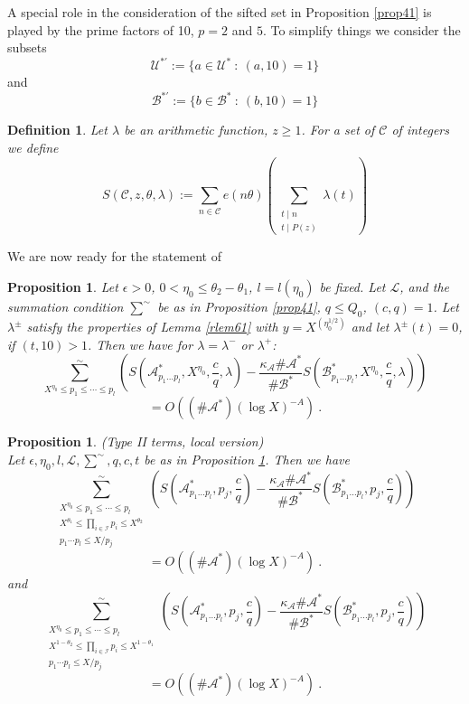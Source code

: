 \documentclass{amsart}
\newtheorem{proposition}[theorem]{Proposition}
\numberwithin{equation}{subsection}
\newtheorem{definition}[theorem]{Definition}
\begin{document}
A special role in the consideration of the sifted set in Proposition \ref{prop41} is played by the prime factors of 10, $p=2$ and $5$. To simplify things we consider the subsets
$$\mathcal{U}^{*'}:=\{a\in \mathcal{U}^*\::\: (a, 10)=1\}$$
and
$$\mathcal{B}^{*'}:=\{ b\in \mathcal{B}^*\::\: (b, 10)=1\}$$


\begin{definition}\label{def62}
Let $\lambda$ be an arithmetic function, $z\geq 1$. For a set of $\mathcal{C}$ of integers we define 
$$S(\mathcal{C}, z, \theta, \lambda):=\sum_{n\in \mathcal{C}} e(n\theta)\left(\sum_{\substack{t\mid n \\ t\mid P(z)}} \lambda(t)\right)$$
\end{definition}
We are now ready for the statement of 

\begin{proposition}\label{prop63}
Let $\epsilon>0$, $0<\eta_0\leq \theta_2-\theta_1$, $l=l(\eta_0)$ be fixed. Let $\mathcal{L}$, and the summation condition $\sum^\sim$ be as in Proposition \ref{prop41}, $q\leq Q_0$, $(c, q)=1$. Let $\lambda^\pm$ satisfy the properties of Lemma \ref{rlem61} with $y=X^{(\eta_0^{1/2})}$ and let $\lambda^\pm(t)=0$, if $(t, 10)>1$. Then we have for $\lambda=\lambda^-$ or $\lambda^+$:
$$\sum_{X^{\eta_0}\leq p_1\leq \cdots \leq p_l}^\sim \left( S\left(\mathcal{A}^*_{p_1 \ldots p_l}, X^{\eta_0}, \frac{c}{q}, \lambda\right)-
\frac{\kappa_{\mathcal{A}}\#\mathcal{A}^*}{\#\mathcal{B}^*}  S\left(\mathcal{B}^*_{p_1 \ldots p_l}, X^{\eta_0}, \frac{c}{q}, \lambda\right)  \right)$$
$$=O\left((\#\mathcal{A}^*)(\log X)^{-A}\right)\:.$$
\end{proposition}

\begin{proposition}\label{prop64}(Type II terms, local version)\\
Let $\epsilon, \eta_0, l, \mathcal{L}, \sum^\sim, q, c, t$ be as in Proposition \ref{prop63}. Then we have
$$\sum^\sim_{\substack{X^{\eta_0}\leq p_1\leq \cdots \leq p_l \\ X^{\theta_1}\leq \prod_{i\in \mathcal{I}} p_i\leq X^{\theta_2}\\ p_1\cdots p_l\leq X/p_j}} \left( S\left(\mathcal{A}^*_{p_1 \ldots p_l}, p_j, \frac{c}{q}\right)-\frac{\kappa_{\mathcal{A}}\#\mathcal{A}^*}{\#\mathcal{B}^*}  S\left(\mathcal{B}^*_{p_1 \ldots p_l}, p_j, \frac{c}{q}\right)  \right) $$
$$=O\left((\#\mathcal{A}^*)(\log X)^{-A}\right)\:.$$
and
$$\sum^\sim_{\substack{X^{\eta_0}\leq p_1\leq \cdots \leq p_l \\ X^{1-\theta_2}\leq \prod_{i\in \mathcal{I}} p_i\leq X^{1-\theta_1}\\ p_1\cdots p_l\leq X/p_j}} \left( S\left(\mathcal{A}^*_{p_1 \ldots p_l}, p_j, \frac{c}{q}\right)-\frac{\kappa_{\mathcal{A}}\#\mathcal{A}^*}{\#\mathcal{B}^*}  S\left(\mathcal{B}^*_{p_1 \ldots p_l}, p_j, \frac{c}{q}\right)  \right) $$
$$=O\left((\#\mathcal{A}^*)(\log X)^{-A}\right)\:.$$
\end{proposition}
\end{document}
